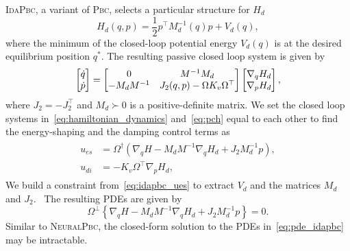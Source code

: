\textsc{IdaPbc}, a variant of \textsc{Pbc}, selects a particular structure for
$H_d$ 
\begin{equation}
  H_d(q, p) = \frac{1}{2} p^\top M_d^{-1}(q) p + V_d(q),
  \label{eq:idapbc_desired_hamiltonian}
\end{equation}
\noindent where the minimum of the closed-loop potential energy $V_d(q)$ is at
the desired equilibrium position $q^*$.
%
The resulting passive closed loop system is given by~\cite{ortega2002stabilization}
\begin{equation}
  \begin{bmatrix}\dot{q} \\ \dot{p}\end{bmatrix}  =
  \begin{bmatrix}0 & M^{-1}M_d \\ -M_dM^{-1} & J_2(q,p) - \Omega K_v \Omega^\top\end{bmatrix}
  \begin{bmatrix}\nabla_q H_d \\ \nabla_p H_d\end{bmatrix},
  \label{eq:pch}
\end{equation}
where $J_2 = -J_2^\top$ and $M_d \succ 0$ is a positive-definite matrix.
%
We set the closed loop systems in~\eqref{eq:hamiltonian_dynamics}
and~\eqref{eq:pch} equal to each other to find the energy-shaping and the damping control terms as
\begin{align}
  \begin{split}
  u_{es} &= \Omega^{\dagger} \left(\nabla_qH - M_dM^{-1} \nabla_qH_d + J_2M_d^{-1}p\right), \\
  u_{di} &= -K_v \Omega^\top \nabla_p H_d,
  \end{split}
  \label{eq:idapbc_ues}
\end{align}
%
We build a constraint from~\eqref{eq:idapbc_ues} to extract $V_d$ and the
matrices $M_d$ and $J_2$.~ The resulting PDEs are given by 
\begin{equation}
  \Omega^\perp \left\{ \nabla_qH - M_dM^{-1} \nabla_qH_d + J_2M_d^{-1}p \right\} = 0.
  \label{eq:pde_idapbc}
\end{equation}
%
Similar to \textsc{NeuralPbc}, the closed-form solution to the PDEs
in~\eqref{eq:pde_idapbc} may be intractable. 

